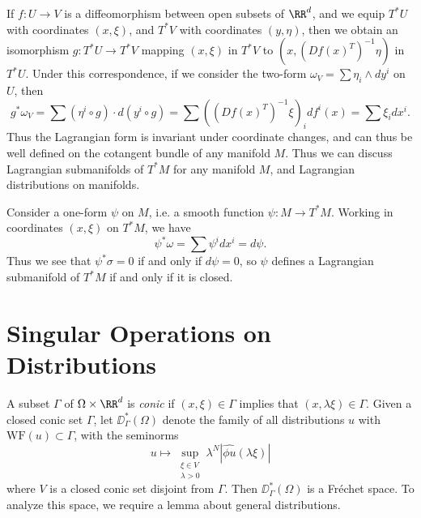 If $f: U \to V$ is a diffeomorphism between open subsets of $\RR^d$, and we equip $T^* U$ with coordinates $(x,\xi)$, and $T^* V$ with coordinates $(y,\eta)$, then we obtain an isomorphism $g: T^* U \to T^* V$ mapping $(x,\xi)$ in $T^* V$ to $(x, (Df(x)^T)^{-1} \eta)$ in $T^* U$. Under this correspondence, if we consider the two-form $\omega_V = \sum \eta_i \wedge dy^i$ on $U$, then
%
\[ g^* \omega_V = \sum (\eta^i \circ g) \cdot d(y^i \circ g) = \sum ((Df(x)^T)^{-1} \xi)_i df^i(x) = \sum \xi_i dx^i. \]
%
Thus the Lagrangian form is invariant under coordinate changes, and can thus be well defined on the cotangent bundle of any manifold $M$. Thus we can discuss Lagrangian submanifolds of $T^* M$ for any manifold $M$, and Lagrangian distributions on manifolds.

\begin{example}
    Consider a one-form $\psi$ on $M$, i.e. a smooth function $\psi: M \to T^* M$. Working in coordinates $(x,\xi)$ on $T^* M$, we have
    \[ \psi^* \omega = \sum \psi^i dx^i = d\psi. \]
    Thus we see that $\psi^* \sigma = 0$ if and only if $d\psi = 0$, so $\psi$ defines a Lagrangian submanifold of $T^* M$ if and only if it is closed.
\end{example}


\section{Singular Operations on Distributions}

A subset $\Gamma$ of $\Omega \times \RR^d$ is \emph{conic} if $(x,\xi) \in \Gamma$ implies that $(x,\lambda \xi) \in \Gamma$. Given a closed conic set $\Gamma$, let $\DD^*_\Gamma(\Omega)$ denote the family of all distributions $u$ with $\text{WF}(u) \subset \Gamma$, with the seminorms
%
\[ u \mapsto \sup_{\substack{\xi \in V\\\lambda > 0}} \lambda^N |\widehat{\phi u}(\lambda \xi)| \]
%
where $V$ is a closed conic set disjoint from $\Gamma$. Then $\DD^*_\Gamma(\Omega)$ is a Fr\'{e}chet space. To analyze this space, we require a lemma about general distributions.

